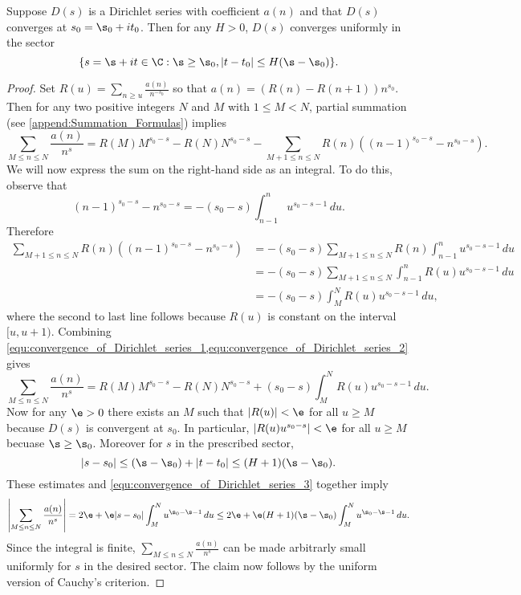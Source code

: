       \begin{theorem}\label{thm:convergence_of_Dirichlet_series}
        Suppose $D(s)$ is a Dirichlet series with coefficient $a(n)$ and that $D(s)$ converges at $s_{0} = \s_{0}+it_{0}$. Then for any $H > 0$, $D(s)$ converges uniformly in the sector
        \[
          \{s = \s+it \in \C:\s \ge \s_{0}, |t-t_{0}| \le H(\s-\s_{0})\}.
        \]
      \end{theorem}
      \begin{proof}
        Set $R(u) = \sum_{n \ge u}\frac{a(n)}{n^{-s_{0}}}$ so that $a(n) = (R(n)-R(n+1))n^{s_{0}}$. Then for any two positive integers $N$ and $M$ with $1 \le M < N$, partial summation (see \cref{append:Summation_Formulas}) implies
        \begin{equation}\label{equ:convergence_of_Dirichlet_series_1}
          \sum_{M \le n \le N}\frac{a(n)}{n^{s}} = R(M)M^{s_{0}-s}-R(N)N^{s_{0}-s}-\sum_{M+1 \le n \le N}R(n)((n-1)^{s_{0}-s}-n^{s_{0}-s}).
        \end{equation}
        We will now express the sum on the right-hand side as an integral. To do this, observe that
        \[
          (n-1)^{s_{0}-s}-n^{s_{0}-s} = -(s_{0}-s)\int_{n-1}^{n}u^{s_{0}-s-1}\,du.
        \]
        Therefore
        \begin{equation}\label{equ:convergence_of_Dirichlet_series_2}
          \begin{aligned}
            \sum_{M+1 \le n \le N}R(n)((n-1)^{s_{0}-s}-n^{s_{0}-s}) &= -(s_{0}-s)\sum_{M+1 \le n \le N}R(n)\int_{n-1}^{n}u^{s_{0}-s-1}\,du \\
            &= -(s_{0}-s)\sum_{M+1 \le n \le N}\int_{n-1}^{n}R(u)u^{s_{0}-s-1}\,du \\
            &= -(s_{0}-s)\int_{M}^{N}R(u)u^{s_{0}-s-1}\,du,
          \end{aligned}
        \end{equation}
        where the second to last line follows because $R(u)$ is constant on the interval $[u,u+1)$. Combining \cref{equ:convergence_of_Dirichlet_series_1,equ:convergence_of_Dirichlet_series_2} gives
        \begin{equation}\label{equ:convergence_of_Dirichlet_series_3}
          \sum_{M \le n \le N}\frac{a(n)}{n^{s}} = R(M)M^{s_{0}-s}-R(N)N^{s_{0}-s}+(s_{0}-s)\int_{M}^{N}R(u)u^{s_{0}-s-1}\,du.
        \end{equation}
        Now for any $\e > 0$ there exists an $M$ such that $|R(u)| < \e$ for all $u \ge M$ because $D(s)$ is convergent at $s_{0}$. In particular, $|R(u)u^{s_{0}-s}| < \e$ for all $u \ge M$ becuase $\s \ge \s_{0}$. Moreover for $s$ in the prescribed sector,
        \[
          |s-s_{0}| \le (\s-\s_{0})+|t-t_{0}| \le (H+1)(\s-\s_{0}).
        \]
        These estimates and \cref{equ:convergence_of_Dirichlet_series_3} together imply
        \[
          \left|\sum_{M \le n \le N}\frac{a(n)}{n^{s}}\right| = 2\e+\e|s-s_{0}|\int_{M}^{N}u^{\s_{0}-\s-1}\,du \le 2\e+\e(H+1)(\s-\s_{0})\int_{M}^{N}u^{\s_{0}-\s-1}\,du.
        \]
        Since the integral is finite, $\sum_{M \le n \le N}\frac{a(n)}{n^{s}}$ can be made arbitrarly small uniformly for $s$ in the desired sector. The claim now follows by the uniform version of Cauchy's criterion.
      \end{proof}
      
